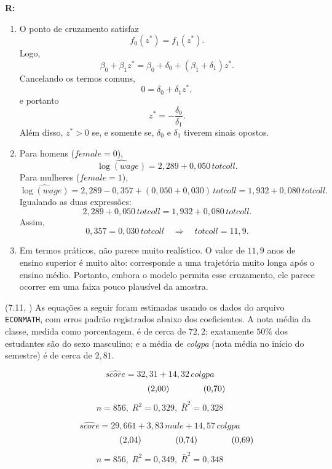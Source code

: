 \documentclass[12pt,letterpaper, onecolumn]{exam}
\renewenvironment{solution}
{\par\noindent\textbf{R:}\enspace\color{blue}}
{\par\color{black}}
\begin{document}
\begin{questions}
\begin{solution}
\begin{enumerate}[label=(\roman*)]
    \item O ponto de cruzamento satisfaz
    \[
    f_0(z^\ast)=f_1(z^\ast).
    \]
    Logo,
    \[
    \beta_0+\beta_1 z^\ast = \beta_0+\delta_0+(\beta_1+\delta_1)z^\ast.
    \]
    Cancelando os termos comuns,
    \[
    0=\delta_0+\delta_1 z^\ast,
    \]
    e portanto
    \[
    z^\ast = -\frac{\delta_0}{\delta_1}.
    \]
    Além disso, \(z^\ast>0\) se, e somente se, \(\delta_0\) e \(\delta_1\) tiverem sinais opostos.

    \item Para homens (\(female=0\)),
    \[
    \widehat{\log(wage)} = 2{,}289 + 0{,}050\,totcoll.
    \]
    Para mulheres (\(female=1\)),
    \[
    \widehat{\log(wage)} = 2{,}289 - 0{,}357 + (0{,}050+0{,}030)\,totcoll
    = 1{,}932 + 0{,}080\,totcoll.
    \]
    Igualando as duas expressões:
    \[
    2{,}289 + 0{,}050\,totcoll = 1{,}932 + 0{,}080\,totcoll.
    \]
    Assim,
    \[
    0{,}357 = 0{,}030\,totcoll
    \quad \Rightarrow \quad
    totcoll = 11{,}9.
    \]

    \item Em termos práticos, não parece muito realístico. O valor de \(11{,}9\) anos de ensino superior é muito alto: corresponde a uma trajetória muito longa após o ensino médio. Portanto, embora o modelo permita esse cruzamento, ele parece ocorrer em uma faixa pouco plausível da amostra.
\end{enumerate}
\end{solution}

\vspace{0.7cm}

\question (7.11, \citep{wooldridge2016}) As equações a seguir foram estimadas usando os dados do arquivo \texttt{ECONMATH}, com erros padrão registrados abaixo dos coeficientes. A nota média da classe, medida como porcentagem, é de cerca de \(72{,}2\); exatamente \(50\%\) dos estudantes são do sexo masculino; e a média de \textit{colgpa} (nota média no início do semestre) é de cerca de \(2{,}81\).

\[
\widehat{score} = 32{,}31 + 14{,}32\,colgpa
\]
\[
\hspace{2.2cm} (2{,}00)\hspace{1.4cm}(0{,}70)
\]
\[
n = 856,\; R^2 = 0{,}329,\; \bar{R}^2 = 0{,}328
\]

\[
\widehat{score} = 29{,}661 + 3{,}83\,male + 14{,}57\,colgpa
\]
\[
\hspace{2.2cm} (2{,}04)\hspace{1.4cm}(0{,}74)\hspace{1.4cm}(0{,}69)
\]
\[
n = 856,\; R^2 = 0{,}349,\; \bar{R}^2 = 0{,}348
\]


\end{questions}
\end{document}
